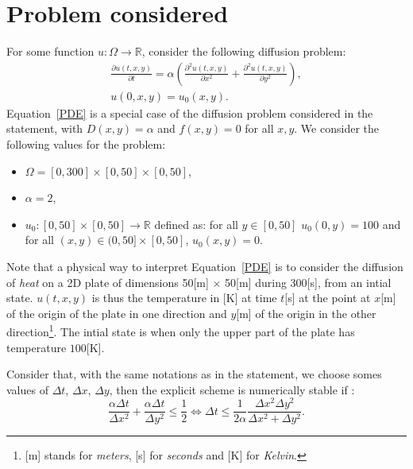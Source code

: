 \documentclass{article}
\begin{document}
\cfoot{}

\section{Problem considered}
\label{problem}
For  some function $u: \Omega \to \mathbb{R}$, consider the following diffusion problem:
\begin{equation}
\label{PDE}
\begin{aligned}
	\frac{\partial u(t, x, y)}{\partial t} = \alpha \left( \frac{\partial^2 u(t, x, y)}{\partial x^2} + \frac{\partial^2 u(t, x, y)}{\partial y^2} \right), \\
	u(0, x, y) = u_0(x, y).
\end{aligned}
\end{equation}
Equation~\eqref{PDE} is a special case of the diffusion problem considered in the statement, with $D(x, y) = \alpha$ and $f(x, y) = 0$ for all $x, y$. We consider the following values for the problem: 
\begin{itemize}
	\item $\Omega = [0, 300] \times [0, 50] \times [0, 50]$,
	\item $\alpha = 2$, 
	\item $u_0: [0, 50] \times [0, 50] \to \mathbb{R}$ defined as: for all $y \in [0, 50]$ $u_0(0, y) = 100$ and for all $(x, y) \in (0, 50] \times [0, 50]$, $u_0(x, y) = 0$.
\end{itemize}
Note that a physical way to interpret Equation~\eqref{PDE} is to consider the diffusion of \emph{heat} on a 2D plate of dimensions 50[m] $\times$ 50[m] during 300[s], from an intial state. $u(t, x, y)$ is thus the temperature in [K] at time $t$[s] at the point at $x$[m] of the origin of the plate in one direction and $y$[m] of the origin in the other direction\footnote{[m] stands for \emph{meters}, [s] for \emph{seconds} and [K] for \emph{Kelvin}.}. The intial state is when only the upper part of the plate has temperature $100$[K].

Consider that, with the same notations as in the statement, we choose somes values of $\Delta t$, $\Delta x$, $\Delta y$, then the explicit scheme is numerically stable if \cite[Equations (3.5), (3.6)]{morton_mayers_2005}:
\begin{equation}
\label{stable}
	\frac{\alpha \Delta t}{\Delta x^2} + \frac{\alpha \Delta t}{\Delta y^2} \leq \frac{1}{2} \iff \Delta t \leq \frac{1}{2\alpha} \frac{\Delta x^2 \Delta y^2}{\Delta x^2 + \Delta y^2}.
\end{equation}
\end{document}
